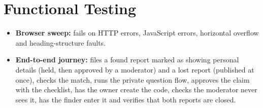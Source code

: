 \documentclass[12pt,a4paper,oneside]{report}
\begin{document}
\section{Functional Testing}
\begin{itemize}
  \item \textbf{Browser sweep:} fails on HTTP errors, JavaScript errors, horizontal overflow and heading-structure faults.
  \item \textbf{End-to-end journey:} files a found report marked as showing personal details (held, then approved by a moderator) and a lost report (published at once), checks the match, runs the private question flow, approves the claim with the checklist, has the owner create the code, checks the moderator never sees it, has the finder enter it and verifies that both reports are closed.
\end{itemize}
\end{document}
